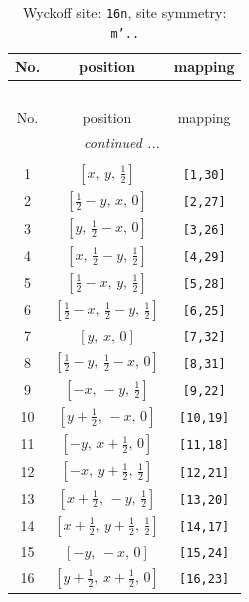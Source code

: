 \documentclass[fleqn,8pt]{jsarticle}
\begin{document}
\renewcommand{\arraystretch}{1.2}
\begin{longtable}{ccc}
\caption{Wyckoff site: {\tt 16n}, site symmetry: {\tt m'..}}
 \\
 \hline \hline
No. & position & mapping \\ \hline \endfirsthead

\multicolumn{2}{l}{\tablename\ \thetable{}} \\
 \hline \hline
No. & position & mapping \\ \hline \endhead

 \hline \hline
\multicolumn{2}{r}{\footnotesize\it continued ...} \\ \endfoot

 \hline \hline
\multicolumn{2}{r}{} \\ \endlastfoot

1 & $\left[ x,\, y,\, \frac{1}{2} \right]$ & {\tt [1,30]} \\ \hline
2 & $\left[ \frac{1}{2} - y,\, x,\, 0 \right]$ & {\tt [2,27]} \\ \hline
3 & $\left[ y,\, \frac{1}{2} - x,\, 0 \right]$ & {\tt [3,26]} \\ \hline
4 & $\left[ x,\, \frac{1}{2} - y,\, \frac{1}{2} \right]$ & {\tt [4,29]} \\ \hline
5 & $\left[ \frac{1}{2} - x,\, y,\, \frac{1}{2} \right]$ & {\tt [5,28]} \\ \hline
6 & $\left[ \frac{1}{2} - x,\, \frac{1}{2} - y,\, \frac{1}{2} \right]$ & {\tt [6,25]} \\ \hline
7 & $\left[ y,\, x,\, 0 \right]$ & {\tt [7,32]} \\ \hline
8 & $\left[ \frac{1}{2} - y,\, \frac{1}{2} - x,\, 0 \right]$ & {\tt [8,31]} \\ \hline
9 & $\left[ - x,\, - y,\, \frac{1}{2} \right]$ & {\tt [9,22]} \\ \hline
10 & $\left[ y + \frac{1}{2},\, - x,\, 0 \right]$ & {\tt [10,19]} \\ \hline
11 & $\left[ - y,\, x + \frac{1}{2},\, 0 \right]$ & {\tt [11,18]} \\ \hline
12 & $\left[ - x,\, y + \frac{1}{2},\, \frac{1}{2} \right]$ & {\tt [12,21]} \\ \hline
13 & $\left[ x + \frac{1}{2},\, - y,\, \frac{1}{2} \right]$ & {\tt [13,20]} \\ \hline
14 & $\left[ x + \frac{1}{2},\, y + \frac{1}{2},\, \frac{1}{2} \right]$ & {\tt [14,17]} \\ \hline
15 & $\left[ - y,\, - x,\, 0 \right]$ & {\tt [15,24]} \\ \hline
16 & $\left[ y + \frac{1}{2},\, x + \frac{1}{2},\, 0 \right]$ & {\tt [16,23]} \\
\end{longtable}
\end{document}
